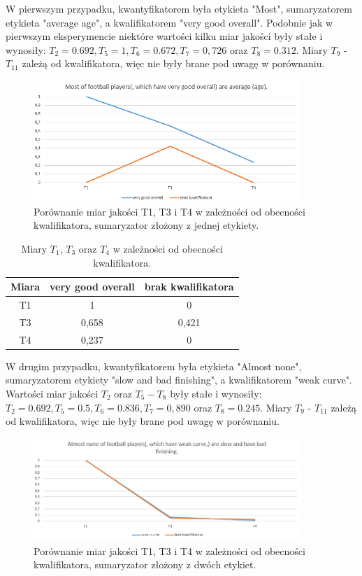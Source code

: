 \documentclass{classrep}
\begin{document}
	W pierwszym przypadku, kwantyfikatorem była etykieta "Most", sumaryzatorem etykieta "average age", a kwalifikatorem "very good overall". Podobnie jak w pierwszym eksperymencie niektóre wartości kilku miar jakości były stałe i wynosiły: $T_2 = 0.692, T_5 = 1, T_6 = 0.672, T_7 = 0,726$ oraz $T_8 = 0.312$. Miary $T_9$ - $T_{11}$ zależą od kwalifikatora, więc nie były brane pod uwagę w porównaniu.
	
	\begin{figure}[h!]
		\centering
		\includegraphics[width=0.9\textwidth]{ex/2a.png}
		\caption{Porównanie miar jakości T1, T3 i T4 w zależności od obecności kwalifikatora, sumaryzator złożony z jednej etykiety.}
		\label{wykresex2a}
	\end{figure}
	
	\begin{table}[h!]
		\centering
		\begin{tabular} {c c c}
			\hline
			\textbf{Miara} & \textbf{very good overall} & \textbf{brak kwalifikatora} \\ [0.5ex] 
			\hline	
			\hline 
			T1	&1&	0\\
			T3	&0,658&	0,421\\
			T4	&0,237&	0\\			
			\hline			
		\end{tabular}
		\caption{Miary $T_1$, $T_3$ oraz $T_4$ w zależności od obecności kwalifikatora. }
		\label{tabelaex2a}
	\end{table}

	W drugim przypadku, kwantyfikatorem była etykieta "Almost none", sumaryzatorem etykiety "slow and bad finishing", a kwalifikatorem "weak curve". Wartości miar jakości $T_2$ oraz $T_5 - T_8$ były stałe i wynosiły: $T_2 = 0.692, T_5 = 0.5, T_6 = 0.836, T_7 = 0,890$ oraz $T_8 = 0.245$. Miary $T_9$ - $T_{11}$ zależą od kwalifikatora, więc nie były brane pod uwagę w porównaniu.	
	
	
	\begin{figure}[h!]
		\centering
		\includegraphics[width=0.9\textwidth]{ex/2b.png}
		\caption{Porównanie miar jakości T1, T3 i T4 w zależności od obecności kwalifikatora, sumaryzator złożony z dwóch etykiet.}
		\label{wykresex2b}
	\end{figure}
	
\end{document}
